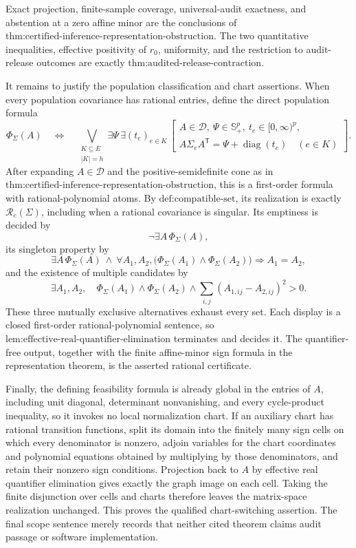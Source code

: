 Exact projection, finite-sample coverage, universal-audit exactness, and abstention at a zero affine minor are the conclusions of \(\text{thm:certified-inference-representation-obstruction}\).  The two quantitative inequalities, effective positivity of \(r_0\), uniformity, and the restriction to audit-release outcomes are exactly \(\text{thm:audited-release-contraction}\).

It remains to justify the population classification and chart assertions.  When every population covariance has rational entries, define the direct population formula
\[
 \Phi_{\Sigma}(A)\quad\Longleftrightarrow\quad
 \bigvee_{\substack{K\subseteq E\\|K|=h}}
 \exists\Psi\,\exists(t_e)_{e\in K}\,
 \left[
 \begin{array}{l}
 A\in\mathcal D,\ \Psi\in\mathbb S_+^p,\ t_e\in[0,\infty)^p,\\
 A\Sigma_eA^{\mathsf T}=\Psi+\operatorname{diag}(t_e)\quad(e\in K)
 \end{array}
 \right].
\]
After expanding \(A\in\mathcal D\) and the positive-semidefinite cone as in \(\text{thm:certified-inference-representation-obstruction}\), this is a first-order formula with rational-polynomial atoms.  By \(\text{def:compatible-set}\), its realization is exactly \(\mathcal R_c(\Sigma)\), including when a rational covariance is singular.  Its emptiness is decided by
\[
 \neg\exists A\,\Phi_{\Sigma}(A),
\]
its singleton property by
\[
 \exists A\,\Phi_{\Sigma}(A)
 \ \wedge\ 
 \forall A_1,A_2,
 \bigl(\Phi_{\Sigma}(A_1)\wedge\Phi_{\Sigma}(A_2)\bigr)
 \Longrightarrow A_1=A_2,
\]
and the existence of multiple candidates by
\[
 \exists A_1,A_2,
 \quad \Phi_{\Sigma}(A_1)\wedge\Phi_{\Sigma}(A_2)
 \wedge\sum_{i,j}(A_{1,ij}-A_{2,ij})^2>0.
\]
These three mutually exclusive alternatives exhaust every set.  Each display is a closed first-order rational-polynomial sentence, so \(\text{lem:effective-real-quantifier-elimination}\) terminates and decides it.  The quantifier-free output, together with the finite affine-minor sign formula in the representation theorem, is the asserted rational certificate.

Finally, the defining feasibility formula is already global in the entries of \(A\), including unit diagonal, determinant nonvanishing, and every cycle-product inequality, so it invokes no local normalization chart.  If an auxiliary chart has rational transition functions, split its domain into the finitely many sign cells on which every denominator is nonzero, adjoin variables for the chart coordinates and polynomial equations obtained by multiplying by those denominators, and retain their nonzero sign conditions.  Projection back to \(A\) by effective real quantifier elimination gives exactly the graph image on each cell.  Taking the finite disjunction over cells and charts therefore leaves the matrix-space realization unchanged.  This proves the qualified chart-switching assertion.  The final scope sentence merely records that neither cited theorem claims audit passage or software implementation.